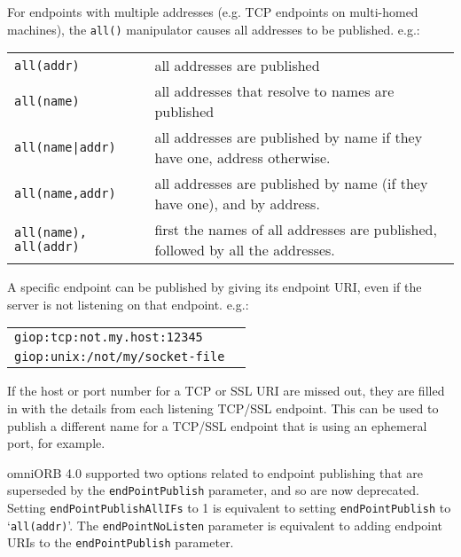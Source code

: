 \documentclass[11pt,oneside,a4paper]{book}
\newcommand{\code}[1]{\texttt{#1}}
\begin{document}
\vspace{\baselineskip}

\noindent
For endpoints with multiple addresses (e.g. TCP endpoints on
multi-homed machines), the \code{all()} manipulator causes all
addresses to be published. e.g.:

\vspace{\baselineskip}

\begin{tabular}{p{}p{}}
\code{all(addr)} & all addresses are published\\
\code{all(name)} & all addresses that resolve to names are published\\
\code{all(name|addr)} & all addresses are published by name if they have
                        one, address otherwise.\\
\code{all(name,addr)} & all addresses are published by name (if they
                        have one), and by address.\\
\code{all(name), all(addr)} & first the names of all addresses are published,
                             followed by all the addresses.\\
\end{tabular}

\vspace{\baselineskip}

\noindent
A specific endpoint can be published by giving its endpoint URI,
even if the server is not listening on that endpoint. e.g.:

\vspace{\baselineskip}

\begin{tabular}{p{}p{}}
\code{giop:tcp:not.my.host:12345}\\
\code{giop:unix:/not/my/socket-file}\\
\end{tabular}

\vspace{\baselineskip}

\noindent
If the host or port number for a TCP or SSL URI are missed out,
they are filled in with the details from each listening TCP/SSL
endpoint. This can be used to publish a different name for a
TCP/SSL endpoint that is using an ephemeral port, for example.

omniORB 4.0 supported two options related to endpoint publishing that
are superseded by the \code{endPointPublish} parameter, and so are now
deprecated. Setting \code{endPointPublishAllIFs} to 1 is equivalent to
setting \code{endPointPublish} to `\code{all(addr)}'. The
\code{endPointNoListen} parameter is equivalent to adding endpoint
URIs to the \code{endPointPublish} parameter.
\end{document}
